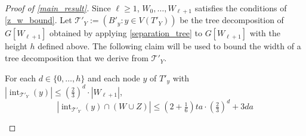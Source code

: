 \documentclass{patmorin}
\DeclareMathOperator{\sep}{sn}
\DeclareMathOperator{\interior}{int}
\begin{document}
\begin{proof}[Proof of \cref{main_result}]
  Since $\ell \ge 1$, $W_0,\ldots,W_{\ell+1}$ satisfies the conditions of \cref{z_w_bound}.
  Let $\mathcal{T}'_Y:=(B'_y:y\in V(T'_Y))$ be the tree decomposition of $G[W_{\ell+1}]$ obtained by applying \cref{separation_tree} to $G[W_{\ell+1}]$ with the height $h$ defined above.  The following claim will be used to bound the width of a tree decomposition that we derive from $\mathcal{T}'_Y$.

  \begin{clm} \label{cell_bound}
     For each $d\in\{0,\ldots,h\}$ and
     each node $y$ of $T'_y$ with $|\interior_{\mathcal{T}'_Y}(y)|\le (\tfrac{2}{3})^d\cdot |W_{\ell+1}|$,
     \begin{equation}
       |\interior_{\mathcal{T}'_Y}(y)\cap (W\cup Z)|  \le (2+\tfrac{1}{6})ta\cdot (\tfrac{2}{3})^{d}+3da \label{t_bound}
     \end{equation}
   \end{clm}



\end{proof}
\end{document}
